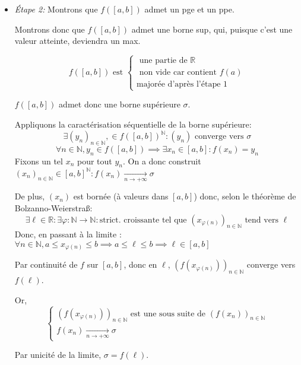 \documentclass{article}
\begin{document}
\begin{question_kholle}
\begin{itemize}
		donc $(f(x_{\varphi(n)}))_{n \in \mathbb{N}}$, tend vers $+ \infty$, ce qui est absurde, donc $f$ est majorée.
		
		On fait de même pour la minoration.
		
		\item  \emph{Étape 2:} Montrons que $f([a, b])$ admet un pge et un ppe.
		
		Montrons donc que $f([a, b])$ admet une borne sup, qui, puisque c'est une valeur atteinte, deviendra un max.
		
		$$
		f([a, b]) \text{ est } \left\{ \begin{array}{ll}
		\text{ une partie de } \mathbb{R} \\
		\text{ non vide car contient } f(a) \\
		\text{majorée d'après l'étape 1}
		\end{array}\right.
		$$
		
		$f([a, b])$ admet donc une borne supérieure $\sigma$.
		
		Appliquons la caractérisation séquentielle de la borne supérieure:
		$$
		\exists (y_{n})_{n \in \mathbb{N}}, \in f([a, b])^{\mathbb{N}} : (y_{n}) \text{ converge vers } \sigma
		$$
		$$
		\forall n \in \mathbb{N}, y_{n} \in f([a, b]) \implies \exists x_{n} \in [a, b] : f(x_{n} ) = y_{n}
		$$
		Fixons un tel $x_{n}$ pour tout $y_{n}$.
		On a donc construit $(x_{n})_{n \in \mathbb{N}} \in [a, b]^{\mathbb{N}} : f(x_{n}) \xrightarrow[n \to +\infty]{} \sigma$
		
		De plus, $(x_{n})$ est bornée (à valeurs dans $[a, b]$) donc, selon le théorème de Bolzanno-Weierstraß:
		$$
		\exists \ell \in \mathbb{R} : \exists \varphi : \mathbb{N} \to \mathbb{N} : \text{strict. croissante tel que } (x_{\varphi(n)})_{n \in \mathbb{N}} \text{ tend vers } \ell
		$$
		Donc, en passant à la limite : $\forall n \in \mathbb{N}, a \leqslant x_{\varphi(n)} \leqslant b \implies a \leqslant \ell \leqslant b \implies \ell \in [a, b]$


		Par continuité de $f$ sur $[a, b]$, donc en $\ell$, $(f(x_{\varphi(n)}))_{n \in \mathbb{N}}$ converge vers $f(\ell)$.
		
		Or,
		$$
		\left\{ \begin{array}{ll}
		(f(x_{\varphi(n)}))_{n \in \mathbb{N}} \text{ est une sous suite de } (f(x_{n}))_{n \in \mathbb{N}} \\
		f(x_{n}) \xrightarrow[n \to + \infty]{} \sigma
		\end{array}\right.$$
		
		Par unicité de la limite, $\sigma = f(\ell)$.
		

\end{itemize}
\end{question_kholle}
\end{document}
